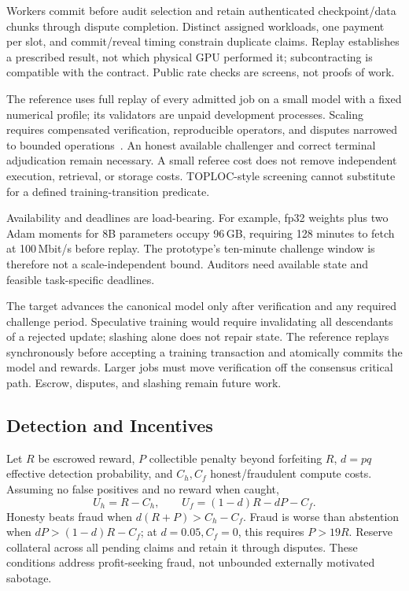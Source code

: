 \documentclass[conference]{IEEEtran}
\begin{document}
Workers commit before audit selection and retain authenticated checkpoint/data chunks through dispute completion. Distinct assigned workloads, one payment per slot, and commit/reveal timing constrain duplicate claims. Replay establishes a prescribed result, not which physical GPU performed it; subcontracting is compatible with the contract. Public rate checks are screens, not proofs of work.

The reference uses full replay of every admitted job on a small model with a fixed numerical profile; its validators are unpaid development processes. Scaling requires compensated verification, reproducible operators, and disputes narrowed to bounded operations~\cite{arun2025verde}. An honest available challenger and correct terminal adjudication remain necessary. A small referee cost does not remove independent execution, retrieval, or storage costs. TOPLOC-style screening cannot substitute for a defined training-transition predicate.

Availability and deadlines are load-bearing. For example, fp32 weights plus two Adam moments for 8B parameters occupy 96\,GB, requiring 128 minutes to fetch at 100\,Mbit/s before replay. The prototype's ten-minute challenge window is therefore not a scale-independent bound. Auditors need available state and feasible task-specific deadlines.

The target advances the canonical model only after verification and any required challenge period. Speculative training would require invalidating all descendants of a rejected update; slashing alone does not repair state. The reference replays synchronously before accepting a training transaction and atomically commits the model and rewards. Larger jobs must move verification off the consensus critical path. Escrow, disputes, and slashing remain future work.

\subsection{Detection and Incentives}

Let $R$ be escrowed reward, $P$ collectible penalty beyond forfeiting $R$, $d=pq$ effective detection probability, and $C_h,C_f$ honest/fraudulent compute costs. Assuming no false positives and no reward when caught,
\begin{equation}
 U_h=R-C_h,\qquad U_f=(1-d)R-dP-C_f.
\end{equation}
Honesty beats fraud when $d(R+P)>C_h-C_f$. Fraud is worse than abstention when $dP>(1-d)R-C_f$; at $d=0.05,C_f=0$, this requires $P>19R$. Reserve collateral across all pending claims and retain it through disputes. These conditions address profit-seeking fraud, not unbounded externally motivated sabotage.
\end{document}
